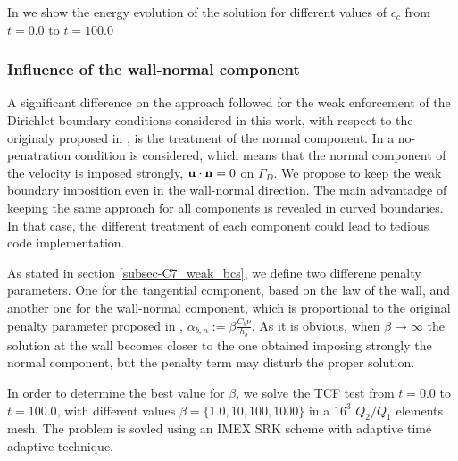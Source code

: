 In \Fig{} we show the energy evolution of the solution for different values of $ c_c $ from $ t=0.0 $ to $ t=100.0 $


\subsubsection{Influence of the wall-normal component}
A significant difference on the approach followed for the weak enforcement of the Dirichlet boundary conditions considered in this work, with respect to the originaly proposed in \cite{bazilevs_weak_2007}, is the treatment of the normal component. In \cite{bazilevs_weak_2007} a no-penatration condition is considered, which means that the normal component of the velocity is imposed strongly, $ {\bf u}\cdot{\bf n}=0 $ on $ \Gamma_D $. We propose to keep the weak boundary imposition even in the wall-normal direction. The main advantadge of keeping the same approach for all components is revealed in curved boundaries. In that case, the different treatment of each component could lead to tedious code implementation.

As stated in section \ref{subsec-C7_weak_bcs}, we define two differene penalty parameters. One for the tangential component, based on the law of the wall, and another one for the wall-normal component, which is proportional to the original penalty parameter proposed in \cite{bazilevs_weak_2007-1}, $ \alpha_{b,n}:=\beta\frac{C_b\nu}{h_b} $. As it is obvious, when $ \beta\rightarrow\infty $ the solution at the wall becomes closer to the one obtained imposing strongly the normal component, but the penalty term may disturb the proper solution. 

In order to determine the best value for $ \beta $, we solve the TCF test from $ t=0.0 $ to $ t=100.0 $, with different values $ \beta=\{1.0,10,100,1000\} $ in a $ 16^3 $ $ Q_2/Q_1 $ elements mesh. The problem is sovled using an IMEX SRK scheme with adaptive time adaptive technique.

